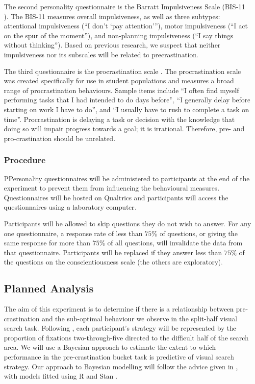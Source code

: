 \documentclass[]{rsos}
\begin{document}
The second personality questionnaire is the Barratt Impulsiveness Scale (BIS-11 \cite{patton1995}). The BIS-11 measures overall impulsiveness, as well as three subtypes: attentional impulsiveness (``I don't `pay attention'''), motor impulsiveness (``I act on the spur of the moment''), and non-planning impulsiveness (``I say things without thinking''). Based on previous research, we suspect that neither impulsiveness nor its subscales will be related to precrastination.

The third questionnaire is the procrastination scale \cite{lay1986}. The procrastination scale was created specifically for use in student populations and measures a broad range of procrastination behaviours. Sample items include ``I often find myself performing tasks that I had intended to do days before'', ``I generally delay before starting on work I have to do'', and ``I usually have to rush to complete a task on time''. Procrastination is delaying a task or decision with the knowledge that doing so will impair progress towards a goal; it is irrational. Therefore, pre- and pro-crastination should be unrelated.

\subsubsection{Procedure}

PPersonality questionnaires will be administered to participants at the end of the experiment to prevent them from influencing the behavioural measures. Questionnaires will be hosted on Qualtrics and participants will access the questionnaires using a laboratory computer.

Participants will be allowed to skip questions they do not wish to answer. For any one questionnaire, a response rate of less than $75\%$ of questions, or giving the same response for more than $75\%$ of all questions, will invalidate the data from that questionnaire. Participants will be replaced if they answer less than $75\%$ of the questions on the conscientiousness scale (the others are exploratory).

\subsection{Planned Analysis}

The aim of this experiment is to determine if there is a relationship between pre-crastination and the sub-optimal behaviour we observe in the split-half visual search task. Following \cite{nowakowska2017, clarke2019}, each participant's strategy will be represented by the proportion of fixations two-through-five directed to the difficult half of the search area. We will use a Bayesian approach to estimate the extent to which performance in the pre-crastination bucket task is predictive of visual search strategy. Our approach to Bayesian modelling will follow the advice given in \cite{mcelreath2016}, with models fitted using R \cite{r2019} and Stan \cite{carpenter2017stan}. 
\end{document}
